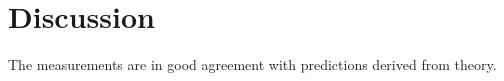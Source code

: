 \section{Discussion}
\label{sec:discussion}

The measurements are in good agreement with predictions derived from theory.
